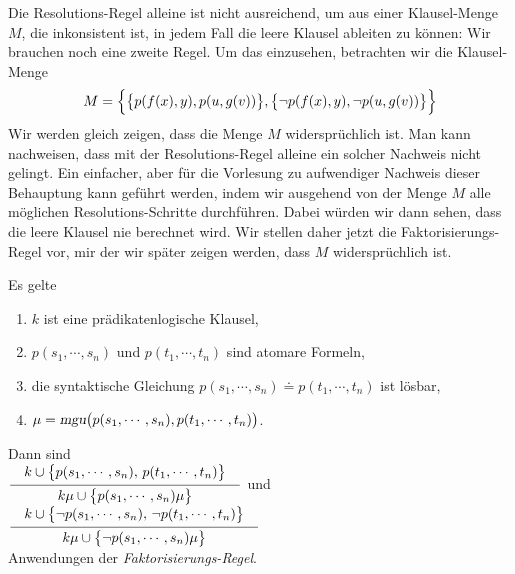 \noindent
Die Resolutions-Regel alleine ist nicht ausreichend, um aus einer Klausel-Menge $M$, die
inkonsistent ist, in 
jedem Fall die leere Klausel ableiten zu k\"{o}nnen: Wir brauchen noch eine zweite Regel.
Um das einzusehen, betrachten wir die Klausel-Menge 
\[ M = \Bigl\{ \bigl\{p(f(x),y), p(u,g(v))\bigr\}, 
               \bigl\{\neg p(f(x),y), \neg p(u,g(v))\bigr\} \Bigr\} 
\]
Wir werden gleich zeigen, dass die Menge $M$ widerspr\"{u}chlich ist.  Man kann nachweisen,
dass mit der Resolutions-Regel alleine ein solcher Nachweis nicht gelingt.
Ein einfacher, aber f\"{u}r die Vorlesung zu aufwendiger Nachweis dieser Behauptung kann
gef\"{u}hrt werden, indem wir ausgehend von der Menge $M$ alle m\"{o}glichen Resolutions-Schritte
durchf\"{u}hren.  Dabei w\"{u}rden wir dann sehen, dass die leere Klausel nie berechnet wird.
Wir stellen daher jetzt die
Faktorisierungs-Regel vor, mir der wir sp\"{a}ter zeigen werden, dass $M$ widerspr\"{u}chlich
ist.

\begin{Definition}[Faktorisierung] Es gelte 
  \begin{enumerate}
  \item $k$ ist  eine pr\"{a}dikatenlogische Klausel,
  \item $p(s_1,\cdots,s_n)$ und $p(t_1,\cdots,t_n)$ sind atomare Formeln,
  \item die syntaktische Gleichung $p(s_1,\cdots,s_n)  \doteq p(t_1,\cdots,t_n)$ ist l\"{o}sbar, 
  \item $\mu = \textsl{mgu}\bigl(p(s_1,\cdots,s_n), p(t_1,\cdots,t_n)\bigr)$.
  \end{enumerate}
  Dann sind \\[0.3cm]
  \hspace*{0.8cm}
  $\schluss{k \cup \bigl\{p(s_1,\cdots,s_n),\, p(t_1,\cdots,t_n)\bigl\}}{k\mu \cup \bigl\{p(s_1,\cdots,s_n)\mu\bigr\} }$ 
  \quad und \quad
  $\schluss{k \cup \bigl\{ \neg p(s_1,\cdots,s_n),\, \neg p(t_1,\cdots,t_n)\bigl\}}{k\mu \cup \bigl\{\neg p(s_1,\cdots,s_n)\mu\bigr\} }$ 
  \\[0.3cm]
  Anwendungen der \emph{Faktorisierungs-Regel}.
  \eox
\end{Definition}

